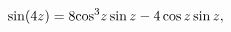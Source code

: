 \[\mathop{\sin\/}\nolimits\!\left(4z\right)=8{\mathop{\cos\/}\nolimits^{3}}z%
\mathop{\sin\/}\nolimits z-4\mathop{\cos\/}\nolimits z\mathop{\sin\/}\nolimits
z,\]